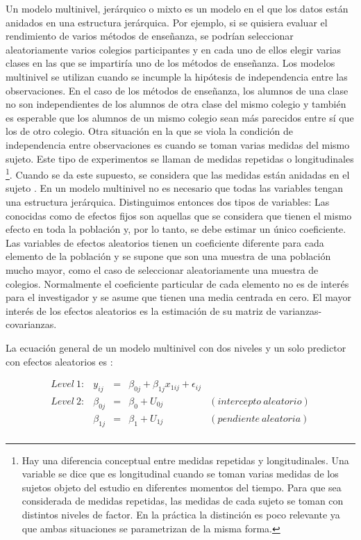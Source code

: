\documentclass[
  12pt,
  a4paper,
  extrafontsizes,
  onecolumn,
  openright,
  table]{memoir}
\begin{document}
Un modelo multinivel, jerárquico o mixto es un modelo en el que los
datos están anidados en una estructura jerárquica. Por ejemplo, si se
quisiera evaluar el rendimiento de varios métodos de enseñanza, se
podrían seleccionar aleatoriamente varios colegios participantes y en
cada uno de ellos elegir varias clases en las que se impartiría uno de
los métodos de enseñanza. Los modelos multinivel se utilizan cuando se
incumple la hipótesis de independencia entre las observaciones. En el
caso de los métodos de enseñanza, los alumnos de una clase no son
independientes de los alumnos de otra clase del mismo colegio y también
es esperable que los alumnos de un mismo colegio sean más parecidos
entre sí que los de otro colegio. Otra situación en la que se viola la
condición de independencia entre observaciones es cuando se toman varias
medidas del mismo sujeto. Este tipo de experimentos se llaman de medidas
repetidas o longitudinales \footnote{Hay una diferencia conceptual entre
  medidas repetidas y longitudinales. Una variable se dice que es
  longitudinal cuando se toman varias medidas de los sujetos objeto del
  estudio en diferentes momentos del tiempo. Para que sea considerada de
  medidas repetidas, las medidas de cada sujeto se toman con distintos
  niveles de factor. En la práctica la distinción es poco relevante ya
  que ambas situaciones se parametrizan de la misma forma.}. Cuando se
da este supuesto, se considera que las medidas están anidadas en el
sujeto \autocite[ver][]{Liu2202}. En un modelo multinivel no es
necesario que todas las variables tengan una estructura jerárquica.
Distinguimos entonces dos tipos de variables: Las conocidas como de
efectos fijos son aquellas que se considera que tienen el mismo efecto
en toda la población y, por lo tanto, se debe estimar un único
coeficiente. Las variables de efectos aleatorios tienen un coeficiente
diferente para cada elemento de la población y se supone que son una
muestra de una población mucho mayor, como el caso de seleccionar
aleatoriamente una muestra de colegios. Normalmente el coeficiente
particular de cada elemento no es de interés para el investigador y se
asume que tienen una media centrada en cero. El mayor interés de los
efectos aleatorios es la estimación de su matriz de
varianzas-covarianzas.

La ecuación general de un modelo multinivel con dos niveles y un solo
predictor con efectos aleatorios es \autocite[ver][pp.~40]{chen2021}:

\[
\begin{aligned}
Level\ 1: & y_{ij}     & = & \beta_{0j} + \beta_{1j}x_{1ij} + \epsilon_{ij} \\
Level\ 2: & \beta_{0j} & = & \beta_{0} + U_{0j} & (intercepto\ aleatorio) \\
          & \beta_{1j} & = & \beta_{1} + U_{1j} & (pendiente\ aleatoria) \\
\end{aligned}
\]
\end{document}
